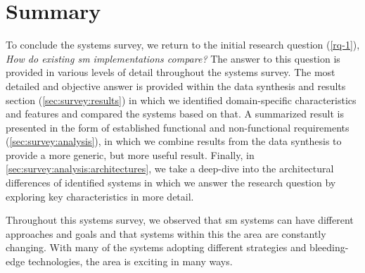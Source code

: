 \section{Summary}
\label{sec:survey:summary}

To conclude the systems survey, we return to the initial research question (\ref{rq-1}), \textit{How do existing \gls{sm} implementations compare?} The answer to this question is provided in various levels of detail throughout the systems survey. The most detailed and objective answer is provided  within the data synthesis and results section (\cref{sec:survey:results}) in which we identified domain-specific characteristics and features and compared the systems based on that. A summarized result is presented in the form of established functional and non-functional requirements (\cref{sec:survey:analysis}), in which we combine results from the data synthesis to provide a more generic, but more useful result. Finally, in \cref{sec:survey:analysis:architectures}, we take a deep-dive into the architectural differences of identified systems in which we answer the research question by exploring key characteristics in more detail.

Throughout this systems survey, we observed that \gls{sm} systems can have different approaches and goals and that systems within this the area are constantly changing. With many of the systems adopting different strategies and bleeding-edge technologies, the area is exciting in many ways. 